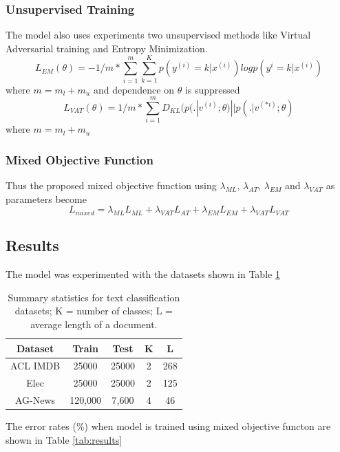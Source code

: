 \documentclass[12pt]{article}
\begin{document}
\subsubsection{Unsupervised Training}
The model also uses experiments two unsupervised methods like Virtual Adversarial training and Entropy Minimization.
\begin{equation}
    \label{eq:AT}
    L_{EM}(\theta) = -1/m * \sum^{m}_{i=1} \sum^{K}_{k=1}p(y^{(i)} = k|x^{(i)}) log p(y^{i}= k |x^({i}))
\end{equation}
where $m=m_{l}+m_{u}$ and dependence on $\theta$ is suppressed
\begin{equation}
    \label{eq:Vat}
    L_{VAT}(\theta)= 1/m * \sum^{m}_{i=1} D_{KL}(p(.|v^{(i)};\theta)||p(.|v^{(*i)};\theta)
\end{equation}
where $m= m_{l} + m_{u}$
\subsubsection{Mixed Objective Function}
Thus the proposed mixed objective function using $\lambda_{ML}$, $\lambda_{AT}$, $\lambda_{EM}$ and $\lambda_{VAT}$ as parameters become 
\begin{equation}
    L_{mixed}= \lambda_{ML}L_{ML} + \lambda_{VAT}L_{AT} + \lambda_{EM}L_{EM} + \lambda_{VAT}L_{VAT} 
\end{equation}
\subsection{Results}
The model was experimented with the datasets shown in Table \ref{tab:dataset}
\begin{table}[]
    
    \begin{tabular}{|c|c|c|c|c|}
        \hline
        Dataset & Train & Test & K & L\\
        \hline
        ACL IMDB & 25000 & 25000 & 2 & 268\\  
        Elec & 25000 & 25000 & 2 & 125\\
        AG-News & 120,000 & 7,600 & 4 & 46\\
        \hline
    \end{tabular}
    \caption{Summary statistics for text classification datasets;
K = number of classes; L = average length of a document.}
    \label{tab:dataset}
\end{table}
The error rates (\%) when model is trained using mixed objective functon are shown in Table \ref{tab:results}
\end{document}
